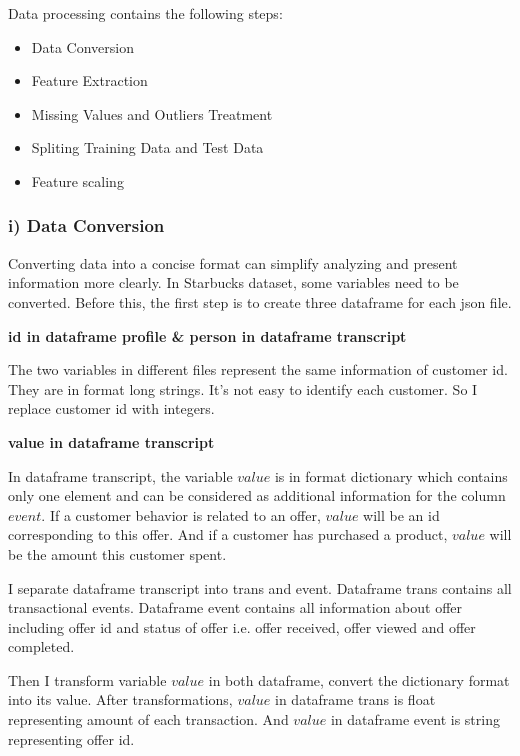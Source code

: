 \documentclass[a4paper,12pt]{article}
\begin{document}
Data processing contains the following steps:

\begin{itemize}

    \item Data Conversion
    \item Feature Extraction
    \item Missing Values and Outliers Treatment
    \item Spliting Training Data and Test Data
    \item Feature scaling

\end{itemize}

\subsubsection*{i) Data Conversion}

Converting data into a concise format can simplify analyzing and present information more clearly. In Starbucks dataset, some 
variables need to be converted. Before this, the first step is to create three dataframe for each json file.

\textbf{id in dataframe profile \& person in dataframe transcript}

The two variables in different files represent the same information of customer id. They are in format long strings. It's not 
easy to identify each customer. So I replace customer id with integers.

\textbf{value in dataframe transcript}

In dataframe transcript, the variable $value$ is in format dictionary which contains only one element and can be considered as 
additional information for the column $event$. If a customer behavior is related to an offer, $value$ will be an id 
corresponding to this offer. And if a customer has purchased a product, $value$ will be the amount this customer spent.

I separate dataframe transcript into trans and event. Dataframe trans contains all transactional events. Dataframe event 
contains all information about offer including offer id and status of offer i.e. offer received, offer viewed and offer 
completed.

Then I transform variable $value$ in both dataframe, convert the dictionary format into its value. After transformations, 
$value$ in dataframe trans is float representing amount of each transaction. And $value$ in dataframe event is string 
representing offer id.
\end{document}
